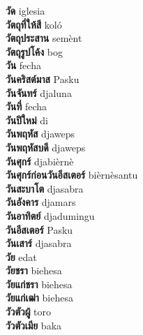 \textbf{ วัด  } iglesia \\
\textbf{ วัตถุที่ให้สี  } koló \\
\textbf{ วัตถุประสาน  } semènt \\
\textbf{ วัตถุรูปโค้ง  } bog \\
\textbf{ วัน  } fecha \\
\textbf{ วันคริสต์มาส  } Pasku \\
\textbf{ วันจันทร์  } djaluna \\
\textbf{ วันที่  } fecha \\
\textbf{ วันปีใหม่  } di \\
\textbf{ วันพฤหัส  } djaweps \\
\textbf{ วันพฤหัสบดี  } djaweps \\
\textbf{ วันศุกร์  } djabièrnè \\
\textbf{ วันศุกร์ก่อนวันอีสเตอร์  } bièrnèsantu \\
\textbf{ วันสะบาโต  } djasabra \\
\textbf{ วันอังคาร  } djamars \\
\textbf{ วันอาทิตย์  } djadumingu \\
\textbf{ วันอีสเตอร์  } Pasku \\
\textbf{ วันเสาร์  } djasabra \\
\textbf{ วัย  } edat \\
\textbf{ วัยชรา  } biehesa \\
\textbf{ วัยแก่ชรา  } biehesa \\
\textbf{ วัยแก่เฒ่า  } biehesa \\
\textbf{ วัวตัวผู้  } toro \\
\textbf{ วัวตัวเมีย  } baka \\
